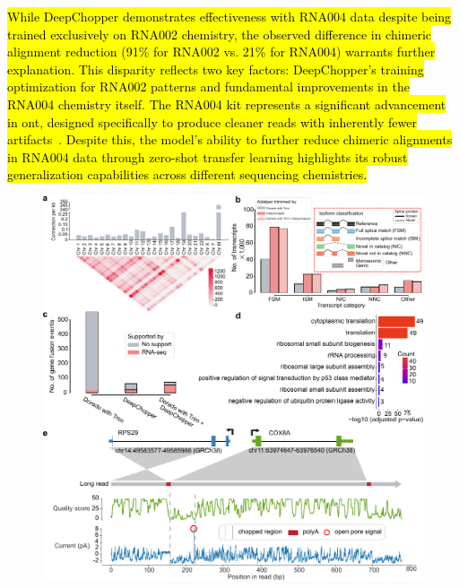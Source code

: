 \documentclass[pdflatex,sn-nature, lineno]{sn-jnl}%
\begin{document}
\hl{While DeepChopper demonstrates effectiveness with RNA004 data despite being trained exclusively on RNA002 chemistry, the observed difference in chimeric alignment reduction (91\% for RNA002 vs. 21\% for RNA004) warrants further explanation.
This disparity reflects two key factors: DeepChopper's training optimization for RNA002 patterns and fundamental improvements in the RNA004 chemistry itself.
The RNA004 kit represents a significant advancement in \mbox{\gls{ont}}, designed specifically to produce cleaner reads with inherently fewer artifacts\mbox{~\cite{hewel2024direct}}.
Despite this, the model's ability to further reduce chimeric alignments in RNA004 data through zero-shot transfer learning highlights its robust generalization capabilities across different sequencing chemistries.}

\begin{figure}[!ht]
	\includegraphics[height=1\columnwidth]{finals/figure3}

\end{figure}
\end{document}
